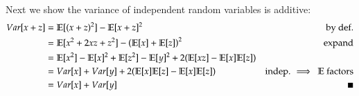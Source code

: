 \documentclass[../main.tex]{subfiles}
\begin{document}
\begin{enumerate}
Next we show the variance of independent random variables is additive:
\begin{align*}
	Var[x + z] &= \mathbb{E}[(x + z)^2] - \mathbb{E}[x + z]^2 &\text{by def.}\\
	&=\mathbb{E}[x^2 + 2xz + z^2] - \left(\mathbb{E}[x] + \mathbb{E}[z]\right)^2 &\text{expand}\\
	&=\mathbb{E}[x^2] - \mathbb{E}[x]^2 + \mathbb{E}[z^2] - \mathbb{E}[y]^2 + 2(\mathbb{E}[xz] - \mathbb{E}[x]\mathbb{E}[z]) &\\
	&=Var[x] + Var[y] + 2(\mathbb{E}[x]\mathbb{E}[z] - \mathbb{E}[x]\mathbb{E}[z]) &\text{indep. $\implies \ \mathbb{E}$ factors}\\
	&= Var[x] + Var[y] &\blacksquare
\end{align*}

\end{enumerate}
\end{document}

